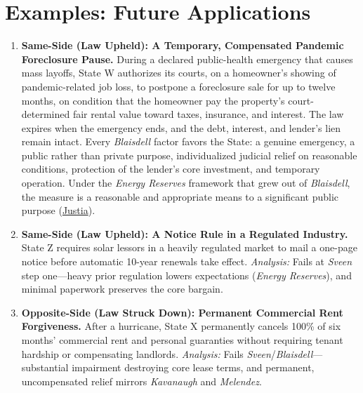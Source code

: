 \documentclass[12pt]{article}
\begin{document}
\section{Examples: Future Applications}
\begin{enumerate}

\item \textbf{Same-Side (Law Upheld): A Temporary, Compensated Pandemic Foreclosure Pause.} During a declared public-health emergency that causes mass layoffs, State W authorizes its courts, on a homeowner's showing of pandemic-related job loss, to postpone a foreclosure sale for up to twelve months, on condition that the homeowner pay the property's court-determined fair rental value toward taxes, insurance, and interest. The law expires when the emergency ends, and the debt, interest, and lender's lien remain intact. Every \textit{Blaisdell} factor favors the State: a genuine emergency, a public rather than private purpose, individualized judicial relief on reasonable conditions, protection of the lender's core investment, and temporary operation. Under the \textit{Energy Reserves} framework that grew out of \textit{Blaisdell}, the measure is a reasonable and appropriate means to a significant public purpose (\href{https://supreme.justia.com/cases/federal/us/290/398/}{Justia}).

\item \textbf{Same-Side (Law Upheld): A Notice Rule in a Regulated Industry.} State Z requires solar lessors in a heavily regulated market to mail a one-page notice before automatic 10-year renewals take effect. \emph{Analysis:} Fails at \emph{Sveen} step one---heavy prior regulation lowers expectations (\emph{Energy Reserves}), and minimal paperwork preserves the core bargain.

\item \textbf{Opposite-Side (Law Struck Down): Permanent Commercial Rent Forgiveness.} After a hurricane, State X permanently cancels 100\% of six months' commercial rent and personal guaranties without requiring tenant hardship or compensating landlords. \emph{Analysis:} Fails \emph{Sveen}/\emph{Blaisdell}---substantial impairment destroying core lease terms, and permanent, uncompensated relief mirrors \emph{Kavanaugh} and \emph{Melendez}.


\end{enumerate}
\end{document}

